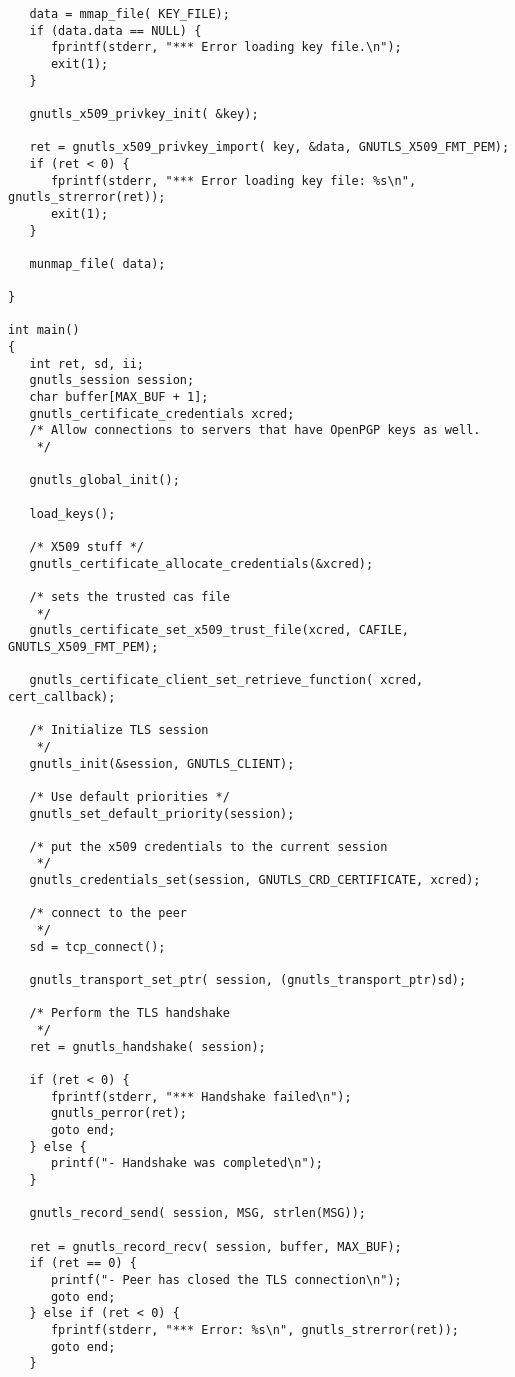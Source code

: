 \begin{verbatim}
   data = mmap_file( KEY_FILE);
   if (data.data == NULL) {
      fprintf(stderr, "*** Error loading key file.\n");
      exit(1);
   }

   gnutls_x509_privkey_init( &key);
   
   ret = gnutls_x509_privkey_import( key, &data, GNUTLS_X509_FMT_PEM);
   if (ret < 0) {
      fprintf(stderr, "*** Error loading key file: %s\n", gnutls_strerror(ret));
      exit(1);
   }

   munmap_file( data);
   
}

int main()
{
   int ret, sd, ii;
   gnutls_session session;
   char buffer[MAX_BUF + 1];
   gnutls_certificate_credentials xcred;
   /* Allow connections to servers that have OpenPGP keys as well.
    */

   gnutls_global_init();

   load_keys();

   /* X509 stuff */
   gnutls_certificate_allocate_credentials(&xcred);

   /* sets the trusted cas file
    */
   gnutls_certificate_set_x509_trust_file(xcred, CAFILE, GNUTLS_X509_FMT_PEM);

   gnutls_certificate_client_set_retrieve_function( xcred, cert_callback);
   
   /* Initialize TLS session 
    */
   gnutls_init(&session, GNUTLS_CLIENT);

   /* Use default priorities */
   gnutls_set_default_priority(session);

   /* put the x509 credentials to the current session
    */
   gnutls_credentials_set(session, GNUTLS_CRD_CERTIFICATE, xcred);

   /* connect to the peer
    */
   sd = tcp_connect();

   gnutls_transport_set_ptr( session, (gnutls_transport_ptr)sd);

   /* Perform the TLS handshake
    */
   ret = gnutls_handshake( session);

   if (ret < 0) {
      fprintf(stderr, "*** Handshake failed\n");
      gnutls_perror(ret);
      goto end;
   } else {
      printf("- Handshake was completed\n");
   }

   gnutls_record_send( session, MSG, strlen(MSG));

   ret = gnutls_record_recv( session, buffer, MAX_BUF);
   if (ret == 0) {
      printf("- Peer has closed the TLS connection\n");
      goto end;
   } else if (ret < 0) {
      fprintf(stderr, "*** Error: %s\n", gnutls_strerror(ret));
      goto end;
   }


\end{verbatim}
